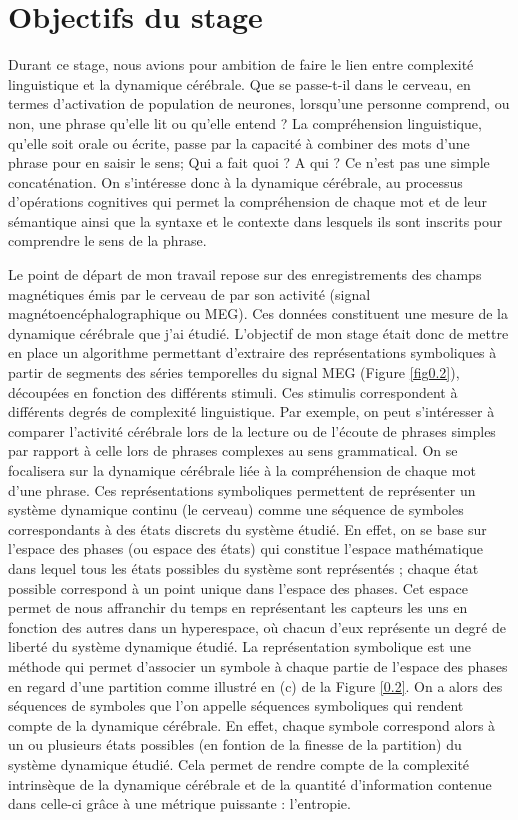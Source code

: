 \section{Objectifs du stage}

Durant ce stage, nous avions pour ambition de faire le lien entre complexité linguistique et la dynamique cérébrale. Que se passe-t-il dans le cerveau, en termes d'activation de population de neurones, lorsqu'une personne comprend, ou non, une phrase qu'elle lit ou qu'elle entend ?
La compréhension linguistique, qu’elle soit orale ou écrite, passe par la capacité à combiner des mots d’une phrase pour en saisir le sens; Qui a fait quoi ? A qui ? Ce n’est pas une simple concaténation. On s’intéresse donc à la dynamique cérébrale, au processus d’opérations cognitives qui permet la compréhension de chaque mot et de leur sémantique ainsi que la syntaxe et le contexte dans lesquels ils sont inscrits pour comprendre le sens de la phrase. 

Le point de départ de mon travail repose sur des enregistrements des champs magnétiques émis par le cerveau de par son activité (signal magnétoencéphalographique ou MEG). Ces données constituent une mesure de la dynamique cérébrale que j'ai étudié. L'objectif de mon stage était donc de mettre en place un algorithme permettant d'extraire des représentations symboliques à partir de segments des séries temporelles du signal MEG (Figure \ref{fig0.2}), découpées en fonction des différents stimuli. Ces stimulis correspondent à différents degrés de complexité linguistique. Par exemple, on peut s'intéresser à comparer l'activité cérébrale lors de la lecture ou de l'écoute de phrases simples par rapport à celle lors de phrases complexes au sens grammatical. On se focalisera sur la dynamique cérébrale liée à la compréhension de chaque mot d'une phrase. Ces représentations symboliques permettent de représenter un système dynamique continu (le cerveau) comme une séquence de symboles correspondants à des états discrets du système étudié. En effet, on se base sur l'espace des phases (ou espace des états) \cite{18} qui constitue l'espace mathématique dans lequel tous les états possibles du système sont représentés ; chaque état possible correspond à un point unique dans l'espace des phases. Cet espace permet de nous affranchir du temps en représentant les capteurs les uns en fonction des autres dans un hyperespace, où chacun d'eux représente un degré de liberté du système dynamique étudié. La représentation symbolique est une méthode qui permet d'associer un symbole à chaque partie de l'espace des phases en regard d'une partition comme illustré en (c) de la Figure \ref{0.2}. On a alors des séquences de symboles que l'on appelle séquences symboliques qui rendent compte de la dynamique cérébrale. En effet, chaque symbole correspond alors à un ou plusieurs états possibles (en fontion de la finesse de la partition) du système dynamique étudié. Cela permet de rendre compte de la complexité intrinsèque de la dynamique cérébrale et de la quantité d'information contenue dans celle-ci grâce à une métrique puissante : l'entropie.

